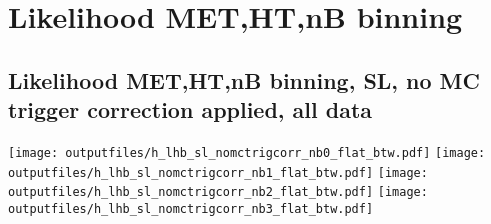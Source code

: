 \documentclass[11pt]{article}
\begin{document}















   \section{Likelihood MET,HT,nB binning}
    \subsection{ Likelihood MET,HT,nB binning, SL, no MC trigger correction applied, all data}

    \noindent
     \texttt{[image: outputfiles/h\_lhb\_sl\_nomctrigcorr\_nb0\_flat\_btw.pdf]}
     \texttt{[image: outputfiles/h\_lhb\_sl\_nomctrigcorr\_nb1\_flat\_btw.pdf]}
     \texttt{[image: outputfiles/h\_lhb\_sl\_nomctrigcorr\_nb2\_flat\_btw.pdf]}
     \texttt{[image: outputfiles/h\_lhb\_sl\_nomctrigcorr\_nb3\_flat\_btw.pdf]}
\end{document}
